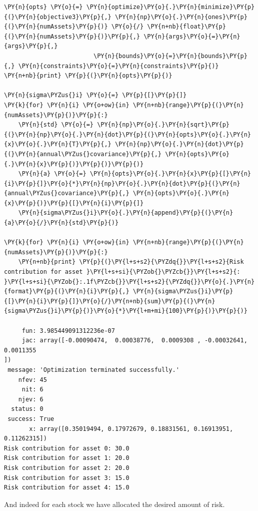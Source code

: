 \begin{tcolorbox}[breakable, size=fbox, boxrule=1pt, pad at break*=1mm,colback=cellbackground, colframe=cellborder]
\begin{Verbatim}[commandchars=\\\{\}]
\PY{n}{opts} \PY{o}{=} \PY{n}{optimize}\PY{o}{.}\PY{n}{minimize}\PY{p}{(}\PY{n}{objective3}\PY{p}{,} \PY{n}{np}\PY{o}{.}\PY{n}{ones}\PY{p}{(}\PY{n}{numAssets}\PY{p}{)} \PY{o}{/} \PY{n+nb}{float}\PY{p}{(}\PY{n}{numAssets}\PY{p}{)}\PY{p}{,} \PY{n}{args}\PY{o}{=}\PY{n}{args}\PY{p}{,}
                         \PY{n}{bounds}\PY{o}{=}\PY{n}{bounds}\PY{p}{,} \PY{n}{constraints}\PY{o}{=}\PY{n}{constraints}\PY{p}{)}
\PY{n+nb}{print} \PY{p}{(}\PY{n}{opts}\PY{p}{)}  

\PY{n}{sigma\PYZus{}i} \PY{o}{=} \PY{p}{[}\PY{p}{]}
\PY{k}{for} \PY{n}{i} \PY{o+ow}{in} \PY{n+nb}{range}\PY{p}{(}\PY{n}{numAssets}\PY{p}{)}\PY{p}{:}
    \PY{n}{std} \PY{o}{=} \PY{n}{np}\PY{o}{.}\PY{n}{sqrt}\PY{p}{(}\PY{n}{np}\PY{o}{.}\PY{n}{dot}\PY{p}{(}\PY{n}{opts}\PY{o}{.}\PY{n}{x}\PY{o}{.}\PY{n}{T}\PY{p}{,} \PY{n}{np}\PY{o}{.}\PY{n}{dot}\PY{p}{(}\PY{n}{annual\PYZus{}covariance}\PY{p}{,} \PY{n}{opts}\PY{o}{.}\PY{n}{x}\PY{p}{)}\PY{p}{)}\PY{p}{)}
    \PY{n}{a} \PY{o}{=} \PY{n}{opts}\PY{o}{.}\PY{n}{x}\PY{p}{[}\PY{n}{i}\PY{p}{]}\PY{o}{*}\PY{n}{np}\PY{o}{.}\PY{n}{dot}\PY{p}{(}\PY{n}{annual\PYZus{}covariance}\PY{p}{,} \PY{n}{opts}\PY{o}{.}\PY{n}{x}\PY{p}{)}\PY{p}{[}\PY{n}{i}\PY{p}{]}
    \PY{n}{sigma\PYZus{}i}\PY{o}{.}\PY{n}{append}\PY{p}{(}\PY{n}{a}\PY{o}{/}\PY{n}{std}\PY{p}{)}

\PY{k}{for} \PY{n}{i} \PY{o+ow}{in} \PY{n+nb}{range}\PY{p}{(}\PY{n}{numAssets}\PY{p}{)}\PY{p}{:}
    \PY{n+nb}{print} \PY{p}{(}\PY{l+s+s2}{\PYZdq{}}\PY{l+s+s2}{Risk contribution for asset }\PY{l+s+si}{\PYZob{}\PYZcb{}}\PY{l+s+s2}{: }\PY{l+s+si}{\PYZob{}:.1f\PYZcb{}}\PY{l+s+s2}{\PYZdq{}}\PY{o}{.}\PY{n}{format}\PY{p}{(}\PY{n}{i}\PY{p}{,} \PY{n}{sigma\PYZus{}i}\PY{p}{[}\PY{n}{i}\PY{p}{]}\PY{o}{/}\PY{n+nb}{sum}\PY{p}{(}\PY{n}{sigma\PYZus{}i}\PY{p}{)}\PY{o}{*}\PY{l+m+mi}{100}\PY{p}{)}\PY{p}{)}

     fun: 3.985449091312236e-07
     jac: array([-0.00090474,  0.00038776,  0.0009308 , -0.00032641,  0.0011355
])
 message: 'Optimization terminated successfully.'
    nfev: 45
     nit: 6
    njev: 6
  status: 0
 success: True
       x: array([0.35019494, 0.17972679, 0.18831561, 0.16913951, 0.11262315])
Risk contribution for asset 0: 30.0
Risk contribution for asset 1: 20.0
Risk contribution for asset 2: 20.0
Risk contribution for asset 3: 15.0
Risk contribution for asset 4: 15.0
    \end{Verbatim}
\end{tcolorbox}
And indeed for each stock we have allocated the desired amount of risk.





